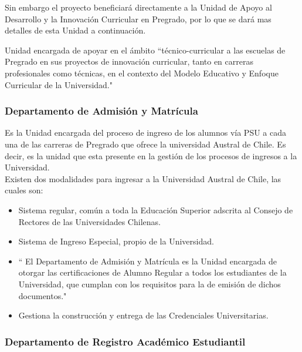 		Sin embargo el proyecto beneficiará directamente  a la Unidad de Apoyo al Desarrollo y la Innovación Curricular en Pregrado, por lo que se dará mas detalles de esta Unidad a continuación.
		
		
		
		Unidad encargada de apoyar en el ámbito ``técnico-curricular a las escuelas de Pregrado en sus proyectos de innovación curricular, tanto en carreras profesionales como técnicas, en el contexto del Modelo Educativo y Enfoque Curricular de la Universidad."\hspace{0.2cm} \cite{Dac15}
		\subsubsection{Departamento de Admisión y Matrícula}
		Es la Unidad encargada del proceso de ingreso de los alumnos vía PSU a cada una de las carreras de Pregrado que ofrece la universidad Austral de Chile. Es decir, es la unidad que esta presente en la gestión de los procesos de ingresos a la Universidad.\\
		
		Existen dos modalidades para ingresar a la Universidad Austral de Chile, las cuales son:
			\begin{itemize}
				\item Sistema regular, común a toda la Educación Superior adscrita al Consejo de Rectores de las Universidades Chilenas.
				\item Sistema de Ingreso Especial, propio de la Universidad.
			\end{itemize}
			
		
			\begin{itemize}
				\item 	`` El Departamento de Admisión y Matrícula es la Unidad encargada de otorgar las certificaciones de Alumno Regular a todos los estudiantes de la Universidad, que cumplan con los requisitos para la de emisión de dichos documentos."\hspace{0.2cm} \cite{Dep15}
				\item Gestiona  la construcción y entrega de las Credenciales Universitarias.
			\end{itemize}
			
		
		
		
		\subsubsection{Departamento de Registro Académico Estudiantil}
		
